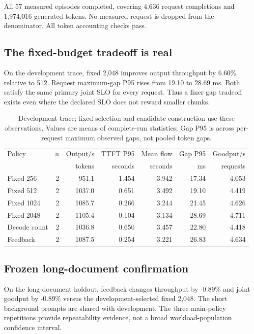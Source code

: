 All 57 measured episodes completed, covering 4,636 request completions and 1,974,016 generated tokens. No measured request is dropped from the denominator. All token accounting checks pass.

\subsection{The fixed-budget tradeoff is real}

On the development trace, fixed 2,048 improves output throughput by 6.60\% relative to 512. Request maximum-gap P95 rises from 19.10 to 28.69 ms. Both satisfy the same primary joint SLO for every request. Thus a finer gap tradeoff exists even where the declared SLO does not reward smaller chunks.

\begin{table}[H]\centering\small
\begin{tabular}{lrrrrrr}
\toprule
Policy & $n$ & Output/s & TTFT P95 & Mean flow & Gap P95 & Goodput/s \\
 & & tokens & seconds & seconds & ms & requests \\ \midrule
Fixed 256 & 2 & 951.1 & 1.454 & 3.942 & 17.34 & 4.053 \\
Fixed 512 & 2 & 1037.0 & 0.651 & 3.492 & 19.10 & 4.419 \\
Fixed 1024 & 2 & 1085.7 & 0.266 & 3.244 & 21.45 & 4.626 \\
Fixed 2048 & 2 & 1105.4 & 0.104 & 3.134 & 28.69 & 4.711 \\
Decode count & 2 & 1036.8 & 0.650 & 3.457 & 22.80 & 4.418 \\
Feedback & 2 & 1087.5 & 0.254 & 3.221 & 26.83 & 4.634 \\
\bottomrule\end{tabular}
\caption{Development trace; fixed selection and candidate construction use these observations. Values are means of complete-run statistics; Gap P95 is across per-request maximum observed gaps, not pooled token gaps.}
\end{table}

\subsection{Frozen long-document confirmation}

On the long-document holdout, feedback changes throughput by -0.89\% and joint goodput by -0.89\% versus the development-selected fixed 2,048. The short background prompts are shared with development. The three main-policy repetitions provide repeatability evidence, not a broad workload-population confidence interval.

